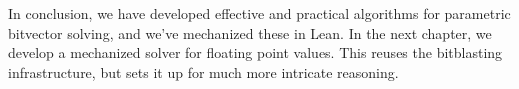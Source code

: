 In conclusion, we have developed effective and practical algorithms for parametric bitvector solving,
and we've mechanized these in Lean. In the next chapter, we develop a mechanized solver for floating point values.
This reuses the bitblasting infrastructure, but sets it up for much more intricate reasoning.




% 


